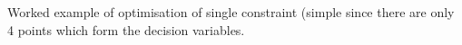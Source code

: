 Worked example of optimisation of single constraint (simple since there are only 4 points which form the decision variables.